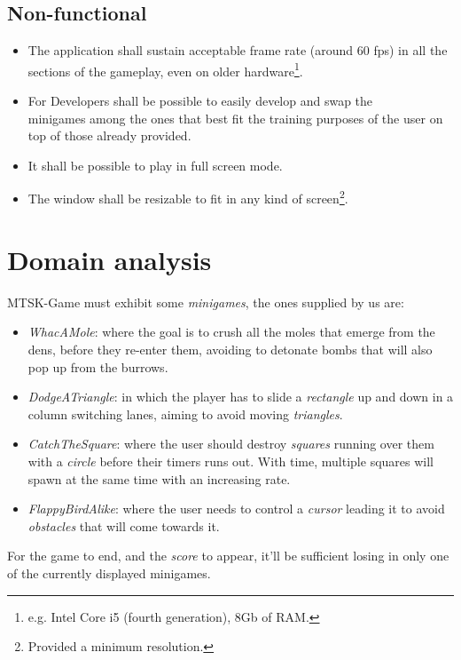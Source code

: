 \documentclass[a4paper,12pt]{report}
\begin{document}
\subsection*{Non-functional}
\begin{itemize}
	\item The application shall sustain acceptable frame rate (around 60 fps) in all the sections of the gameplay, even on older hardware\footnote{e.g. Intel Core i5 (fourth generation), 8Gb of RAM.}.
	\item For Developers shall be possible to easily develop and swap the\\ minigames among the ones that best fit the training purposes of the user on top of those already provided.
	\item It shall be possible to play in full screen mode.
	\item The window shall be resizable to fit in any kind of screen\footnote{Provided a minimum resolution.}.
\end{itemize}



\section{Domain analysis}

MTSK-Game must exhibit some \textit{minigames}, the ones supplied by us are:
\begin{itemize}
	\item \textit{WhacAMole}: where the goal is to crush all the moles that emerge from the dens, before they re-enter them, avoiding to detonate bombs that will also pop up from the burrows.
	\item \textit{DodgeATriangle}: in which the player has to slide a \textit{rectangle} up and down in a column switching lanes, aiming to avoid moving \textit{triangles}.
	\item \textit{CatchTheSquare}: where the user should destroy \textit{squares} running over them with a \textit{circle} before their timers runs out. With time, multiple squares will spawn at the same time with an increasing rate.
	\item \textit{FlappyBirdAlike}: where the user needs to control a \textit{cursor} leading it to avoid \textit{obstacles} that will come towards it.
\end{itemize}
For the game to end, and the \textit{score} to appear, it'll be sufficient losing in only one of the currently displayed minigames.
\end{document}
